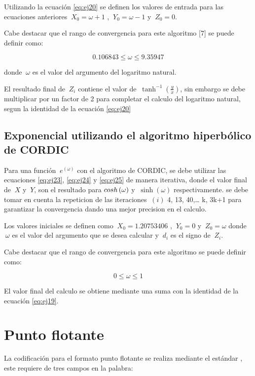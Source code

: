 Utilizando la ecuación \ref{eq:ej20} se definen los valores de entrada para las ecuaciones anteriores  $\ X_0 = \omega + 1$ , $\ Y_0 = \omega - 1$ y $\ Z_0 = 0 $.

Cabe destacar que el rango de convergencia para este algoritmo [7] se puede definir como: 

\begin{equation} \label{eq:ej26}
   0.106843 \leq \omega \leq 9.35947
\end{equation}

donde $\ \omega $ es el valor del argumento del logaritmo natural.

El resultado final de $\ Z_i $ contiene el valor de $\ \tanh^{-1} \left( \frac{y}{x} \right)$, sin embargo se debe multiplicar por un factor de 2 para completar el calculo del logaritmo natural, segun la identidad de la ecuación \ref{eq:ej20} 

\subsection{Exponencial utilizando el algoritmo hiperbólico de CORDIC }


Para una función  $\ e^{\left(\omega\right)} $  con el algoritmo de CORDIC, se debe utilizar las ecuaciones \ref{eq:ej23}, \ref{eq:ej24} y \ref{eq:ej25} de manera iterativa, donde el valor final de $\ X $ y $\ Y$, son el resultado para  $\\cosh\left(\omega\right)$ y $\ \sinh\left(\omega\right)$ respectivamente. se debe tomar en cuenta la repeticion de las iteraciones $\ \left(i\right) $ 4, 13, 40,… k, 3k+1 para garantizar la convergencia dando una mejor precision en el calculo.

Los valores iniciales se definen como  $\ X_0 = 1.20753406 $ , $\ Y_0 = 0$ y $\ Z_0 = \omega $ donde $\ \omega$  es el valor del argumento que se desea calcular y $\ d_i $ es el signo de $\ Z_i $.

Cabe destacar que el rango de convergencia para este algoritmo se puede definir como: 

\begin{equation} \label{eq:ej26}
   0 \leq \omega \leq 1
\end{equation}

El valor final del calculo se obtiene mediante una suma con la identidad de la ecuación \ref{eq:ej19}. 

\section{Punto flotante}
La codificación para el formato punto flotante se realiza mediante el estándar , este requiere de tres campos en la palabra: 

